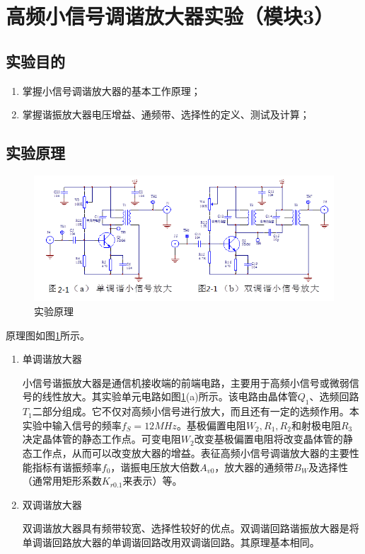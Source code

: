 \documentclass[12pt]{article}%
\numberwithin{equation}{section}
\begin{document}
\section{高频小信号调谐放大器实验（模块3）}
\setcounter{equation}{0}
\setcounter{table}{0}
\setcounter{figure}{0}
\subsection{实验目的}
\begin{enumerate}\addtolength{\itemsep}{-1.5ex}
\item 掌握小信号调谐放大器的基本工作原理；
\item 掌握谐振放大器电压增益、通频带、选择性的定义、测试及计算；
\end{enumerate}
\subsection{实验原理}
 \begin{figure}[ht]
  \centering
  \includegraphics[width=\textwidth]{image006.png} 
  \caption{ 实验原理} 
  \label{img21111} 
\end{figure}
原理图如图\ref{img21111}所示。
\begin{enumerate}\addtolength{\itemsep}{-1.5ex}
\item 单调谐放大器\par
   小信号谐振放大器是通信机接收端的前端电路，主要用于高频小信号或微弱信号的线性放大。其实验单元电路如图\ref{img21111}(a)所示。该电路由晶体管$Q_1$、选频回路$T_1$二部分组成。它不仅对高频小信号进行放大，而且还有一定的选频作用。本实验中输入信号的频率$f_S=12MHz$。基极偏置电阻$W_2,R_1,R_2$和射极电阻$R_3$决定晶体管的静态工作点。可变电阻$W_2$改变基极偏置电阻将改变晶体管的静态工作点，从而可以改变放大器的增益。表征高频小信号调谐放大器的主要性能指标有谐振频率$f_0$，谐振电压放大倍数$A_{v0}$，放大器的通频带$B_W$及选择性（通常用矩形系数$K_{r0.1}$来表示）等。
\item 双调谐放大器\par
    双调谐放大器具有频带较宽、选择性较好的优点。双调谐回路谐振放大器是将单调谐回路放大器的单调谐回路改用双调谐回路。其原理基本相同。
    \end{enumerate}
\end{document}
